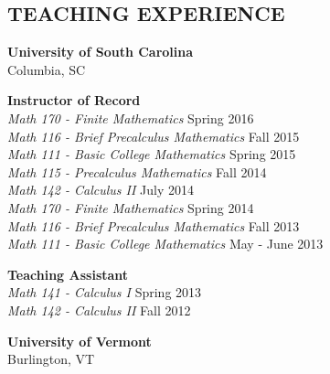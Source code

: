 \documentclass[line,overlapped]{res}
\begin{document}
\begin{resume}
                                                  \section{TEACHING EXPERIENCE}
                                                          {\bf University of South Carolina}\\Columbia, SC
                                                          
                                                          {\bf Instructor of Record}\\
                                                          {\sl Math 170 - Finite Mathematics} \hfill Spring 2016\\
                                                          {\sl Math 116 - Brief Precalculus Mathematics} \hfill Fall 2015\\
                                                          {\sl Math 111 - Basic College Mathematics} \hfill Spring 2015\\
                                                          {\sl Math 115 - Precalculus Mathematics} \hfill Fall 2014\\
                                                          {\sl Math 142 - Calculus II} \hfill July 2014\\
                                                          {\sl Math 170 - Finite Mathematics} \hfill Spring 2014\\
                                                          {\sl Math 116 - Brief Precalculus Mathematics} \hfill Fall 2013\\
                                                          {\sl Math 111 - Basic College Mathematics} \hfill May - June 2013

                                                          {\bf Teaching Assistant}\\
                                                          {\sl Math 141 - Calculus I} \hfill Spring 2013\\
                                                          {\sl Math 142 - Calculus II} \hfill Fall 2012

                                                          {\bf University of Vermont}\\Burlington, VT
                                                          

\end{resume}
\end{document}
